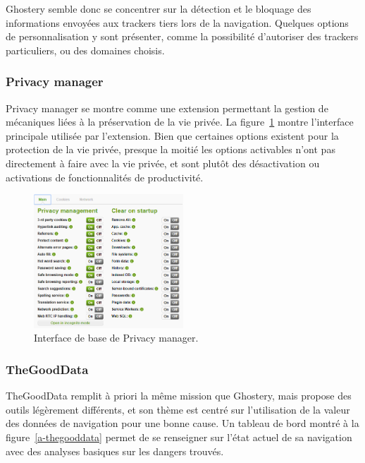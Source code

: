 			Ghostery semble donc se concentrer sur la détection et le bloquage des informations envoyées aux trackers tiers lors de la navigation. Quelques options de personnalisation y sont présenter, comme la possibilité d'autoriser des trackers particuliers, ou des domaines choisis.

		\subsubsection{Privacy manager}

			Privacy manager se montre comme une extension permettant la gestion de mécaniques liées à la préservation de la vie privée. La figure~\ref{a-privacymanager} montre l'interface principale utilisée par l'extension.
			Bien que certaines options existent pour la protection de la vie privée, presque la moitié les options activables n'ont pas directement à faire avec la vie privée, et sont plutôt des désactivation ou activations de fonctionnalités de productivité.

			\begin{figure}[h]
				\centering
				\includegraphics[width=0.5\textwidth]{images/analysis/privacy-manager}
				\caption{Interface de base de Privacy manager\cite{privacymanager}.}
				\label{a-privacymanager}
			\end{figure}

		\subsubsection{TheGoodData}

			TheGoodData remplit à priori la même mission que Ghostery, mais propose des outils légèrement différents, et son thème est centré sur l'utilisation de la valeur des données de navigation pour une bonne cause. Un tableau de bord montré à la figure~\ref{a-thegooddata} permet de se renseigner sur l'état actuel de sa navigation avec des analyses basiques sur les dangers trouvés.

